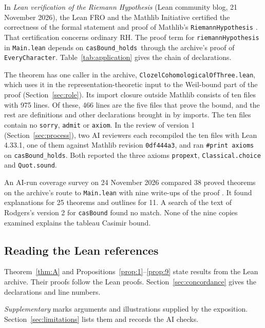 \documentclass[11pt]{amsart}
\newcommand{\lean}[1]{\texttt{#1}}
\DeclareRobustCommand{\casboundname}{\texttt{casBound\_holds}}
\theoremstyle{definition}
\theoremstyle{remark}
\begin{document}
In \emph{Lean verification of the Riemann Hypothesis} (Lean community blog,
21 November 2026), the Lean FRO and the Mathlib Initiative certified the
correctness of the formal statement and proof of Mathlib's
\lean{RiemannHypothesis} \cite{JointStatement}. That certification concerns
ordinary RH. The proof term for \lean{riemannHypothesis} in \lean{Main.lean}
depends on \casboundname\ through the archive's proof of
\lean{EveryCharacter}. Table~\ref{tab:application} gives the chain of
declarations.

The theorem has one caller in the archive,
\lean{ClozelCohomologicalOfThree.\allowbreak{}lean}, which uses it in the
representation-theoretic input to the Weil-bound part of the proof
(Section~\ref{sec:role}). Its import closure outside Mathlib consists of ten
files with 975 lines. Of these, 466 lines are the five files that prove the
bound, and the rest are definitions and other declarations brought in by
imports. The ten files contain no \lean{sorry}, \lean{admit} or \lean{axiom}. In the
review of version 1 (Section~\ref{sec:process}), two AI reviewers each
recompiled the ten files with Lean 4.33.1, one of them against Mathlib
revision \lean{0df444a3}, and ran \lean{\#print axioms} on \casboundname. Both
reported the three axioms \lean{propext}, \lean{Classical.\allowbreak{}choice} and
\lean{Quot.\allowbreak{}sound}.

An AI-run coverage survey on 24 November 2026 compared 38 proved theorems on
the archive's route to \lean{Main.\allowbreak{}lean} with nine write-ups of the proof
\cite{Rodgers,Zhang,Slijepcevic,Jaswal,Rubinstein,Dupuy,Park,Adriazola,Ulam}.
It found explanations for 25 theorems and outlines for 11. A search of the
text of Rodgers's version 2 for \lean{casBound} found no match. None of the nine copies examined explains the tableau Casimir bound.

\subsection{Reading the Lean references}\label{sec:marks}

Theorem~\ref{thm:A} and Propositions~\ref{prop:1}--\ref{prop:9} state
results from the Lean archive. Their proofs follow the Lean proofs.
Section~\ref{sec:concordance} gives the declarations and line numbers.

\emph{Supplementary} marks arguments and illustrations supplied by the
exposition. Section~\ref{sec:limitations} lists them and records the AI
checks.
\end{document}
